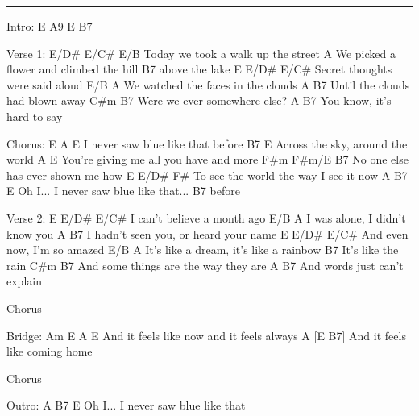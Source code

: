 \noindent\rule{\columnwidth}{1pt}

\begin{multicols}{2}
\begin{lstsong}
Intro:  E    A9   E   B7

Verse 1:
E/D#            E/C#         E/B
Today we took a walk up the street
            A
We picked a flower and climbed the hill
          B7
above the lake
E     E/D#      E/C#
Secret thoughts were said aloud
E/B                           A
We watched the faces in the clouds
A                          B7
Until the clouds had blown away
C#m          B7
Were we ever somewhere else?
        A                   B7
You know, it's hard to say

Chorus:
E            A              E
I never saw blue like that before
            B7               E
Across the sky, around the world
                  A                E
You're giving me all you have and more
F#m            F#m/E           B7
No one else has ever shown me how
E                    E/D#         F#
To see the world the way I see it now
A                    B7            E
Oh I... I never saw blue like that...
 B7
before



Verse 2:
E             E/D#       E/C#
I can't believe a month ago
        E/B               A
I was alone, I didn't know you
              A                  B7
I hadn't seen you, or heard your name
          E   E/D#       E/C#
And even now, I'm so amazed
              E/B                  A
It's like a dream, it's like a rainbow
               B7
It's like the rain
C#m                       B7
And some things are the way they are
A                    B7
And words just can't explain

Chorus

Bridge:
       Am         E          A     E
And it feels like now and it feels always
A                        [E   B7]
And it feels like coming home

Chorus

Outro:
   A                 B7            E
Oh I... I never saw blue like that
\end{lstsong}
\end{multicols}
\newpage


